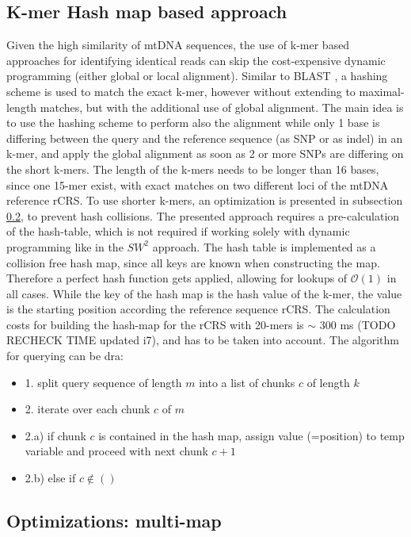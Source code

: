 \subsection{K-mer Hash map based approach}
Given the high similarity of mtDNA sequences, the use of k-mer based approaches for identifying identical reads can skip the cost-expensive dynamic programming (either global or local alignment). Similar to BLAST \cite{Altschul1990}, a hashing scheme is used to match the exact k-mer, however without extending to maximal-length matches, but with the additional use of global alignment. The main idea is to use the hashing scheme to perform also the alignment while only 1 base is differing between the query and the reference sequence (as SNP or as indel) in an k-mer, and apply the global alignment as soon as 2 or more SNPs are differing on the short k-mers. The length of the k-mers needs to be longer than 16 bases, since one 15-mer exist, with exact matches on two different loci of the mtDNA reference rCRS. To use shorter k-mers, an optimization is presented in subsection \ref{align:optim}, to prevent hash collisions.
The presented approach requires a pre-calculation of the hash-table, which is not required if working solely with dynamic programming like in the $SW^{2}$ approach.
The hash table is implemented as a collision free hash map, since all keys are known when constructing the map. Therefore a perfect hash function gets applied, allowing for lookups of $\mathcal{O}(1)$ in all cases. While the key of the hash map is the hash value of the k-mer, the value is the starting position according the reference sequence rCRS. The calculation costs for building the hash-map for the rCRS with 20-mers is $\sim$ 300 ms (TODO RECHECK TIME updated i7), and has to be taken into account.
The algorithm for querying can be dra:
\begin{itemize}
\item 1. split query sequence of length $m$ into a list of chunks $c$ of length $k$
\item 2. iterate over each chunk $c$ of $m$ 
\item 2.a) if chunk $c$ is contained in the hash map, assign value (=position) to temp variable and proceed with next chunk $c+1$
\item 2.b) else if $c \notin()$
\end{itemize}
\subsection{Optimizations: multi-map}\label{align:optim}
